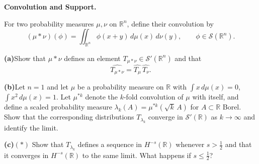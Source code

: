 \begin{problem}[CP-II-0064]
\label{prob:cp-ii-0064}
\textbf{Convolution and Support.}

\hspace*{1.5em}For two probability measures $\mu,\nu$ on $\mathbb R^n$, define their convolution by
\[
(\mu*\nu)(\phi)=\iint_{\mathbb R^n}\phi(x+y)\,d\mu(x)\,d\nu(y),\qquad \phi\in\mathcal S(\mathbb R^n).
\]

	\par\smallskip\noindent\textbf{(a)}\quad Show that $\mu*\nu$ defines an element $T_{\mu*\nu}\in\mathcal S'(\mathbb R^n)$ and that
	\[
	\widehat{T_{\mu*\nu}}=\widehat{T_\mu}\,\widehat{T_\nu}.
	\]
	\par\smallskip\noindent\textbf{(b)}\quad Let $n=1$ and let $\mu$ be a probability measure on $\mathbb R$ with
	$\int x\,d\mu(x)=0$, $\int x^2\,d\mu(x)=1$.
	Let $\mu^{*k}$ denote the $k$-fold convolution of $\mu$ with itself, and define a scaled probability measure
	$\lambda_k(A)=\mu^{*k}(\sqrt{k}\,A)$ for $A\subset\mathbb R$ Borel.
	Show that the corresponding distributions $T_{\lambda_k}$ converge in $\mathcal S'(\mathbb R)$ as $k\to\infty$
	and identify the limit.
	\par\smallskip\noindent\textbf{(c)}\quad $(*)$ Show that $T_{\lambda_k}$ defines a sequence in $H^{-s}(\mathbb R)$ whenever $s>\tfrac12$
	and that it converges in $H^{-s}(\mathbb R)$ to the same limit.
	What happens if $s\le\tfrac12$?
\end{problem}

